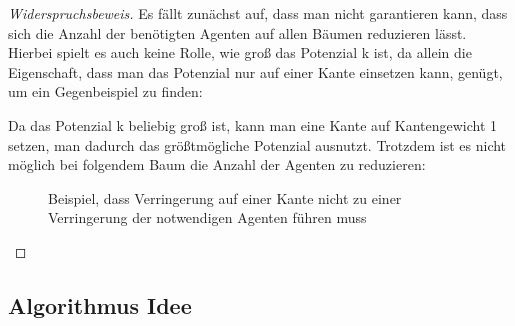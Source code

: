 \begin{proof}[Widerspruchsbeweis]
	Es fällt zunächst auf, dass man nicht garantieren kann, dass sich die Anzahl der benötigten Agenten auf allen Bäumen reduzieren lässt. Hierbei spielt es auch keine Rolle, wie groß das Potenzial k ist, da allein die Eigenschaft, dass man das Potenzial nur auf einer Kante einsetzen kann, genügt, um ein Gegenbeispiel zu finden:
	
	Da das Potenzial k beliebig groß ist, kann man eine Kante auf Kantengewicht 1 setzen, man dadurch das größtmögliche Potenzial ausnutzt. Trotzdem ist es nicht möglich bei folgendem Baum die Anzahl der Agenten zu reduzieren:
	
	\begin{figure}[h]
		\hfill
		\caption{Beispiel, dass Verringerung auf einer Kante nicht zu einer Verringerung der notwendigen Agenten führen muss} 
	\end{figure} 
\end{proof}


\subsection*{Algorithmus Idee}

